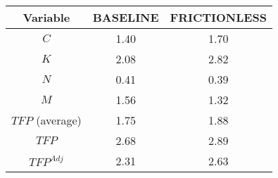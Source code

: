 {\fontshape\scdefault\selectfont 
\centering{} 
\begin{tabular}{ccc} 
\hline\hline 
Variable & BASELINE  & FRICTIONLESS \\ 
\hline 
$C$ &1.40&1.70\\ 
$K$ &2.08&2.82\\ 
$N$ &0.41&0.39\\ 
$M$ &1.56&1.32\\ 
$TFP$ (average) &1.75&1.88\\ 
$TFP$ &2.68&2.89\\ 
$TFP^{Adj}$ &2.31&2.63\\ 
\hline\hline 
\end{tabular} 
} 
